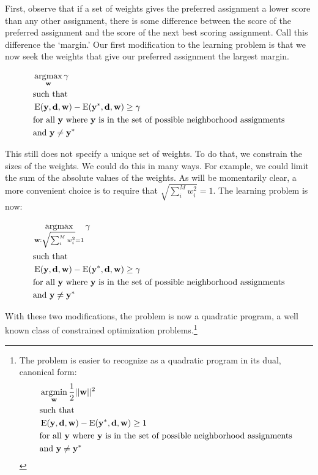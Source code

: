 First, observe that if a set of weights gives the preferred assignment
a lower score than any other assignment, there is some difference
between the score of the preferred assignment and the score of the
next best scoring assignment. Call this difference the `margin.' Our
first modification to the learning problem is that we now seek the
weights that give our preferred assignment the largest margin.

\begin{align}
&\operatorname*{\arg\!\max}_{\mathbf{w}} \mathbf{\gamma} \\
&\text{such that} \\
&\operatorname{E}(\mathbf{y}, \mathbf{d}, \mathbf{w})
- \operatorname{E}(\mathbf{y}^*, \mathbf{d}, \mathbf{w}) \geq \gamma\\ 
&\text{for all } \mathbf{y} \text{ where } \mathbf{y} \text{ is in the set of
  possible neighborhood assignments}\\
&\text{and } \mathbf{y} \neq \mathbf{y}^*
\end{align}

This still does not specify a unique set of weights. To do that, we
constrain the sizes of the weights. We could do this in many ways. For
example, we could limit the sum of the absolute values of the weights. As
will be momentarily clear, a more convenient choice is to require that
$\sqrt{\sum_i^M w_i^2} = 1$. The learning problem is now:

%
\begin{align*}
&\operatorname*{\arg\!\max}_{\mathbf{w}:\sqrt{\sum_i^M w_i^2}=1} \mathbf{\gamma} \\
&\text{such that} \\
&\operatorname{E}(\mathbf{y}, \mathbf{d}, \mathbf{w})
- \operatorname{E}(\mathbf{y}^*, \mathbf{d}, \mathbf{w}) \geq \gamma\\ 
&\text{for all } \mathbf{y} \text{ where } \mathbf{y} \text{ is in the set of
  possible neighborhood assignments}\\
&\text{and } \mathbf{y} \neq \mathbf{y}^*
\end{align*}
%

With these two modifications, the problem is now a quadratic program,
a well known class of constrained optimization problems.\footnote{The
  problem is easier to recognize as a quadratic program in its dual,
  canonical form:
%
\begin{align*}
&\operatorname*{\arg\!\min}_{\mathbf{w}} \frac{1}{2}||\mathbf{w}||^2 \\
&\text{such that} \\
&\operatorname{E}(\mathbf{y}, \mathbf{d}, \mathbf{w})
- \operatorname{E}(\mathbf{y}^*, \mathbf{d}, \mathbf{w}) \geq 1 \\ 
&\text{for all } \mathbf{y} \text{ where } \mathbf{y} \text{ is in the set of
  possible neighborhood assignments}\\
&\text{and } \mathbf{y} \neq \mathbf{y}^*
\end{align*}
}

